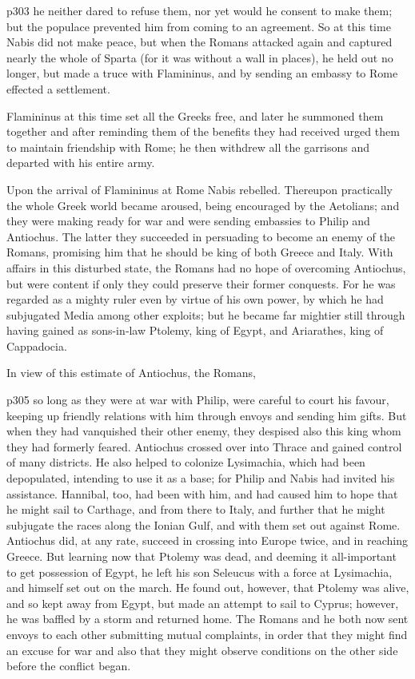 p303 he neither dared to refuse them, nor yet would he consent to make them; but the populace prevented him from coming to an agreement. So at this time Nabis did not make peace, but when the Romans attacked again and captured nearly the whole of Sparta (for it was without a wall in places), he held out no longer, but made a truce with Flamininus, and by sending an embassy to Rome effected a settlement.

Flamininus at this time set all the Greeks free, and later he summoned them together and after reminding them of the benefits they had received urged them to maintain friendship with Rome; he then withdrew all the garrisons and departed with his entire army.

Upon the arrival of Flamininus at Rome Nabis rebelled. Thereupon practically the whole Greek world became aroused, being encouraged by the Aetolians; and they were making ready for war and were sending embassies to Philip and Antiochus. The latter they succeeded in persuading to become an enemy of the Romans, promising him that he should be king of both Greece and Italy. With affairs in this disturbed state, the Romans had no hope of overcoming Antiochus, but were content if only they could preserve their former conquests. For he was regarded as a mighty ruler even by virtue of his own power, by which he had subjugated Media among other exploits; but he became far mightier still through having gained as sons-in\texthebrew{‑}law Ptolemy, king of Egypt, and Ariarathes, king of Cappadocia.

In view of this estimate of Antiochus, the Romans,

p305 so long as they were at war with Philip, were careful to court his favour, keeping up friendly relations with him through envoys and sending him gifts. But when they had vanquished their other enemy, they despised also this king whom they had formerly feared. Antiochus crossed over into Thrace and gained control of many districts. He also helped to colonize Lysimachia, which had been depopulated, intending to use it as a base; for Philip and Nabis had invited his assistance. Hannibal, too, had been with him, and had caused him to hope that he might sail to Carthage, and from there to Italy, and further that he might subjugate the races along the Ionian Gulf, and with them set out against Rome. Antiochus did, at any rate, succeed in crossing into Europe twice, and in reaching Greece. But learning now that Ptolemy was dead, and deeming it all-important to get possession of Egypt, he left his son Seleucus with a force at Lysimachia, and himself set out on the march. He found out, however, that Ptolemy was alive, and so kept away from Egypt, but made an attempt to sail to Cyprus; however, he was baffled by a storm and returned home. The Romans and he both now sent envoys to each other submitting mutual complaints, in order that they might find an excuse for war and also that they might observe conditions on the other side before the conflict began.

